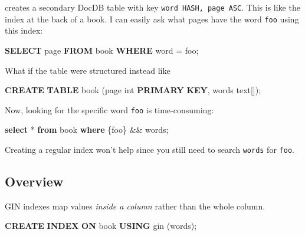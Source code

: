 \documentclass[
]{article}
\newenvironment{Shaded}{}{}
\newcommand{\DataTypeTok}[1]{\textcolor[rgb]{0.56,0.13,0.00}{#1}}
\newcommand{\KeywordTok}[1]{\textcolor[rgb]{0.00,0.44,0.13}{\textbf{#1}}}
\newcommand{\NormalTok}[1]{#1}
\newcommand{\OperatorTok}[1]{\textcolor[rgb]{0.40,0.40,0.40}{#1}}
\newcommand{\StringTok}[1]{\textcolor[rgb]{0.25,0.44,0.63}{#1}}
\begin{document}
creates a secondary DocDB table with key
\texttt{word\ HASH,\ page\ ASC}. This is like the index at the back of a
book. I can easily ask what pages have the word \texttt{foo} using this
index:

\begin{Shaded}
\begin{Highlighting}[]
\KeywordTok{SELECT}\NormalTok{ page }\KeywordTok{FROM}\NormalTok{ book }\KeywordTok{WHERE}\NormalTok{ word }\OperatorTok{=} \StringTok{\textquotesingle{}foo\textquotesingle{}}\NormalTok{;}
\end{Highlighting}
\end{Shaded}

What if the table were structured instead like

\begin{Shaded}
\begin{Highlighting}[]
\KeywordTok{CREATE} \KeywordTok{TABLE}\NormalTok{ book (page }\DataTypeTok{int} \KeywordTok{PRIMARY} \KeywordTok{KEY}\NormalTok{, words text[]);}
\end{Highlighting}
\end{Shaded}

Now, looking for the specific word \texttt{foo} is time-consuming:

\begin{Shaded}
\begin{Highlighting}[]
\KeywordTok{select} \OperatorTok{*} \KeywordTok{from}\NormalTok{ book }\KeywordTok{where} \StringTok{\textquotesingle{}\{foo\}\textquotesingle{}}\NormalTok{ \&\& words;}
\end{Highlighting}
\end{Shaded}

Creating a regular index won't help since you still need to search
\texttt{words} for \texttt{foo}.

\hypertarget{overview}{%
\subsection{Overview}\label{overview}}

GIN indexes map values \emph{inside a column} rather than the whole
column.

\begin{Shaded}
\begin{Highlighting}[]
\KeywordTok{CREATE} \KeywordTok{INDEX} \KeywordTok{ON}\NormalTok{ book }\KeywordTok{USING}\NormalTok{ gin (words);}
\end{Highlighting}
\end{Shaded}
\end{document}
